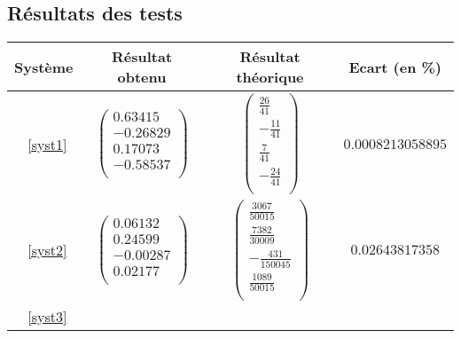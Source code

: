 \documentclass{report}
\begin{document}
      \subsection{Résultats des tests}
      \renewcommand{\arraystretch}{2}
        \begin{tabular}{|c|c|c|c|}
           \hline
           Système & Résultat obtenu & Résultat théorique & Ecart  (en \%)\\ %
           \hline
           ~\eqref{syst1} 
           & 
           $\begin{pmatrix}
              0.63415 \\
              -0.26829	\\
              0.17073	\\
              -0.58537 \\
           \end{pmatrix}$
           &
           $\begin{pmatrix}
              \frac{26}{41} \\
              -\frac{11}{41} \\
              \frac{7}{41} \\
              -\frac{24}{41} \\
           \end{pmatrix}$
           &
           $0.0008213058895$ \\
           \hline
           ~\eqref{syst2} 
           &
           $\begin{pmatrix}
              0.06132 \\
              0.24599	\\
              -0.00287	\\
              0.02177 \\
           \end{pmatrix}$
           &
           $\begin{pmatrix}
              \frac{3067}{50015} \\
              \frac{7382}{30009} \\
              -\frac{431}{150045} \\
              \frac{1089}{50015} \\
           \end{pmatrix}$
           &
           $0.02643817358$ \\
           \hline
           ~\eqref{syst3} 

\end{tabular}
\end{document}
